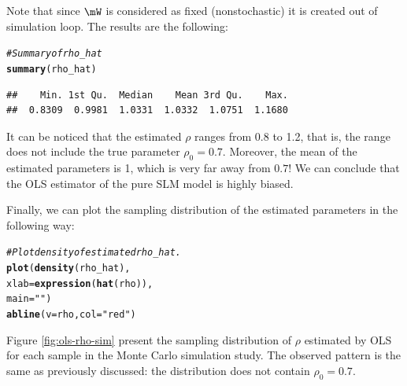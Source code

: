\documentclass[english,12pt]{book}\usepackage[]{graphicx}\usepackage[]{xcolor}
\makeatletter
\newcommand{\hlstr}[1]{\textcolor[rgb]{0.192,0.494,0.8}{#1}}%
\newcommand{\hlcom}[1]{\textcolor[rgb]{0.678,0.584,0.686}{\textit{#1}}}%
\newcommand{\hlstd}[1]{\textcolor[rgb]{0.345,0.345,0.345}{#1}}%
\newcommand{\hlkwc}[1]{\textcolor[rgb]{0.333,0.667,0.333}{#1}}%
\newcommand{\hlkwd}[1]{\textcolor[rgb]{0.737,0.353,0.396}{\textbf{#1}}}%
\newenvironment{kframe}{%
 \def\at@end@of@kframe{}%
 \ifinner\ifhmode%
  \def\at@end@of@kframe{\end{minipage}}%
  \begin{minipage}{\columnwidth}%
 \fi\fi%
 \def\FrameCommand##1{\hskip\@totalleftmargin \hskip-\fboxsep
 \colorbox{shadecolor}{##1}\hskip-\fboxsep
     \hskip-\linewidth \hskip-\@totalleftmargin \hskip\columnwidth}%
 \MakeFramed {\advance\hsize-\width
   \@totalleftmargin\z@ \linewidth\hsize
   \@setminipage}}%
 {\par\unskip\endMakeFramed%
 \at@end@of@kframe}
\newenvironment{knitrout}{}{} %
\makeatother
\begin{document}
Note that since $\mW$ is considered as fixed (nonstochastic) it is created out of simulation loop. 
The results are the following:
\begin{knitrout}
\color{fgcolor}\begin{kframe}
\begin{alltt}
\hlcom{# Summary of rho_hat}
\hlkwd{summary}\hlstd{(rho_hat)}
\end{alltt}
\begin{verbatim}
##    Min. 1st Qu.  Median    Mean 3rd Qu.    Max. 
##  0.8309  0.9981  1.0331  1.0332  1.0751  1.1680
\end{verbatim}
\end{kframe}
\end{knitrout}

It can be noticed that the estimated $\rho$ ranges from 0.8 to 1.2, that is, the range does not include the true parameter $\rho_0 = 0.7$. Moreover, the mean of the estimated parameters is 1, which is very far away from $0.7$! We can conclude that the OLS estimator of the pure SLM model is highly biased.

Finally, we can plot the sampling distribution of the estimated parameters in the following way:

\begin{knitrout}
\color{fgcolor}\begin{kframe}
\begin{alltt}
\hlcom{# Plot density of estimated rho_hat. }
\hlkwd{plot}\hlstd{(}\hlkwd{density}\hlstd{(rho_hat),}
     \hlkwc{xlab} \hlstd{=} \hlkwd{expression}\hlstd{(}\hlkwd{hat}\hlstd{(rho)),}
     \hlkwc{main} \hlstd{=} \hlstr{""}\hlstd{)}
\hlkwd{abline}\hlstd{(}\hlkwc{v} \hlstd{= rho,} \hlkwc{col} \hlstd{=} \hlstr{"red"}\hlstd{)}
\end{alltt}
\end{kframe}
\end{knitrout}

Figure \ref{fig:ols-rho-sim} present the sampling distribution of $\rho$ estimated by OLS for each sample in the Monte Carlo simulation study. The observed pattern is the same as previously discussed: the distribution does not contain $\rho_0 = 0.7$.
\end{document}
